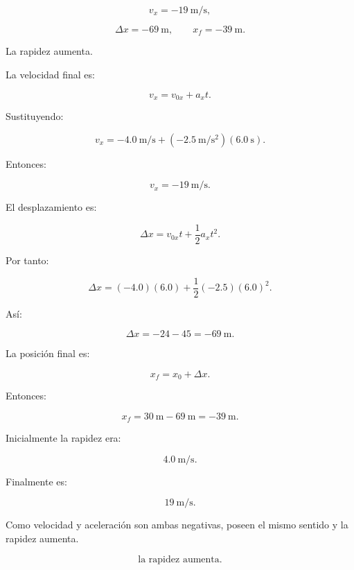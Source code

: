 \begin{respuesta}
\[
v_x=-\SI{19}{\meter\per\second},
\]

\[
\Delta x=-\SI{69}{\meter},
\qquad
x_f=-\SI{39}{\meter}.
\]

La rapidez aumenta.
\end{respuesta}

\begin{explicacion}
La velocidad final es:

\[
v_x=v_{0x}+a_xt.
\]

Sustituyendo:

\[
v_x
=
-\SI{4.0}{\meter\per\second}
+
(-\SI{2.5}{\meter\per\second\squared})
(\SI{6.0}{\second}).
\]

Entonces:

\[ \boxed{v_x=-\SI{19}{\meter\per\second}}. \]

El desplazamiento es:

\[
\Delta x
=
v_{0x}t+\frac{1}{2}a_xt^2.
\]

Por tanto:

\[
\Delta x
=
(-4.0)(6.0)
+
\frac{1}{2}(-2.5)(6.0)^2.
\]

Así:

\[
\Delta x
=
-24-45
=
\boxed{-\SI{69}{\meter}}.
\]

La posición final es:

\[
x_f=x_0+\Delta x.
\]

Entonces:

\[
x_f
=
\SI{30}{\meter}
-
\SI{69}{\meter}
=
\boxed{-\SI{39}{\meter}}.
\]

Inicialmente la rapidez era:

\[ \SI{4.0}{\meter\per\second}. \]

Finalmente es:

\[ \SI{19}{\meter\per\second}. \]

Como velocidad y aceleración son ambas negativas, poseen el mismo sentido y la rapidez aumenta.

\[
\boxed{\text{la rapidez aumenta}}.
\]
\end{explicacion}


